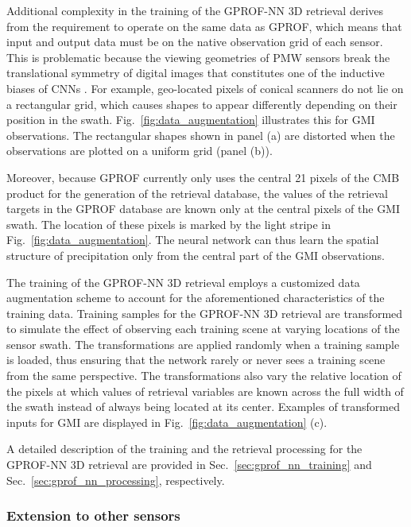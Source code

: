 \documentclass[journal abbreviation, manuscript]{copernicus}
\begin{document}
Additional complexity in the training of the GPROF-NN 3D retrieval derives from
the requirement to operate on the same data as GPROF, which means that input and
output data must be on the native observation grid of each sensor. This is
problematic because the viewing geometries of PMW sensors break the
translational symmetry of digital images that constitutes one of the inductive
biases of CNNs \citep{goodfellow16}. For example, geo-located pixels of conical
scanners do not lie on a rectangular grid, which causes shapes to appear
differently depending on their position in the swath.
Fig.~\ref{fig:data_augmentation} illustrates this for GMI observations. The
rectangular shapes shown in panel (a) are distorted when the observations are
plotted on a uniform grid (panel (b)).

Moreover, because GPROF currently only uses the central 21 pixels of the CMB
product for the generation of the retrieval database, the values of the
retrieval targets in the GPROF database are known only at the central pixels of
the GMI swath. The location of these pixels is marked by the light stripe in
Fig.~\ref{fig:data_augmentation}. The neural network can thus learn the spatial
structure of precipitation only from the central part of the GMI observations.

The training of the GPROF-NN 3D retrieval employs a customized data augmentation
scheme to account for the aforementioned characteristics of the training data.
Training samples for the GPROF-NN 3D retrieval are transformed to simulate the
effect of observing each training scene at varying locations of the sensor
swath. The transformations are applied randomly when a training sample is
loaded, thus ensuring that the network rarely or never sees a training scene
from the same perspective. The transformations also vary the relative location
of the pixels at which values of retrieval variables are known across the full
width of the swath instead of always being located at its center. Examples of
transformed inputs for GMI are displayed in Fig.~\ref{fig:data_augmentation}
(c).

A detailed description of the  training and the retrieval
processing for the GPROF-NN 3D retrieval are provided in
Sec.~\ref{sec:gprof_nn_training} and Sec.~\ref{sec:gprof_nn_processing},
respectively.


\subsubsection{Extension to other sensors}
\label{sec:other_sensors}
\end{document}
